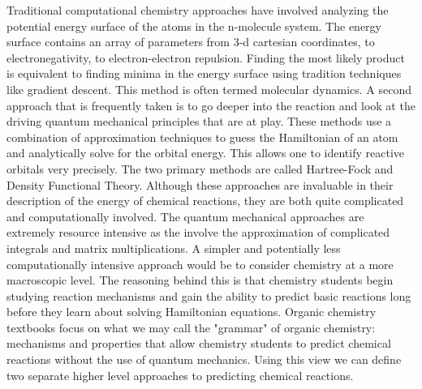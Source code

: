 \documentclass[aps,floatfix,prd,showpacs]{revtex4}
\begin{document}
Traditional computational chemistry approaches have involved analyzing the potential energy surface of the atoms in the n-molecule system.   The energy surface contains an array of parameters from 3-d cartesian coordinates, to electronegativity, to electron-electron repulsion.  Finding the most likely product is equivalent to finding minima in the energy surface using tradition techniques like gradient descent. This method is often termed molecular dynamics. \cite{pes} 
A second approach that is frequently taken is to go deeper into the reaction and look at the driving quantum mechanical principles that are at play. These methods use a combination of approximation techniques to guess the Hamiltonian of an atom and analytically solve for the orbital energy. This allows one to identify reactive orbitals very precisely. The two primary methods are called Hartree-Fock and Density Functional Theory. \cite{HartreeFock} \cite{dft}
Although these approaches are invaluable in their description of the energy of chemical reactions, they are both quite complicated and computationally involved. The quantum mechanical approaches are extremely resource intensive as the involve the approximation of complicated integrals and matrix multiplications. \cite{compComplex} A simpler and potentially less computationally intensive approach would be to consider chemistry at a more macroscopic level. The reasoning behind this is that chemistry students begin studying reaction mechanisms and gain the ability to predict basic reactions long before they learn about solving Hamiltonian equations. Organic chemistry textbooks focus on what we may call the "grammar" of organic chemistry: mechanisms and properties that allow chemistry students to predict chemical reactions without the use of quantum mechanics. Using this view we can define two separate higher level approaches to predicting chemical reactions.
\end{document}
